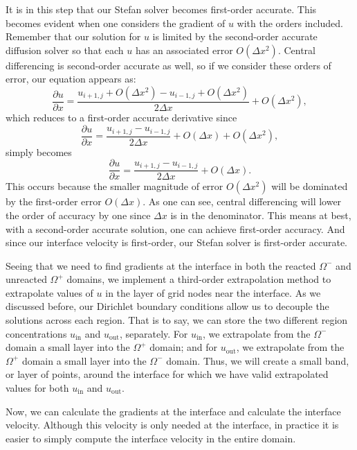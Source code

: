 \documentclass[oneside,12pt,final]{/Applications/TeX/packages/ucthesis-CA2012}
\begin{document}
\begin{mainmatter}
It is in this step that our Stefan solver becomes first-order accurate. This becomes evident when one considers the gradient of $u$ with the orders included. Remember that our solution for $u$ is limited by the second-order accurate diffusion solver so that each $u$ has an associated error $O(\Delta x^2)$. Central differencing is second-order accurate as well, so if we consider these orders of error, our equation appears as:
\begin{equation}
\frac{\partial u}{\partial x} = \frac{u_{i+1,j} + O(\Delta x^2)-u_{i-1,j}+ O(\Delta x^2)}{2 \Delta x} + O(\Delta x^2),
\end{equation}
which reduces to a first-order accurate derivative since 
\begin{equation}
\frac{\partial u}{\partial x} = \frac{u_{i+1,j} -u_{i-1,j}}{2 \Delta x} + O(\Delta x) + O(\Delta x^2),
\end{equation}
simply becomes
\begin{equation}
\frac{\partial u}{\partial x} = \frac{u_{i+1,j} -u_{i-1,j}}{2 \Delta x} + O(\Delta x).
\end{equation}
This occurs because the smaller magnitude of error $O(\Delta x^2)$ will be dominated by the first-order error $O(\Delta x)$. As one can see, central differencing will lower the order of accuracy by one since $\Delta x$ is in the denominator. This means at best, with a second-order accurate solution, one can achieve first-order accuracy. And since our interface velocity is first-order, our Stefan solver is first-order accurate.

Seeing that we need to find gradients at the interface in both the reacted $\Omega^-$ and unreacted $\Omega^+$ domains, we implement a third-order extrapolation method to extrapolate values of $u$ in the layer of grid nodes near the interface. As we discussed before, our Dirichlet boundary conditions allow us to decouple the solutions across each region. That is to say, we can store the two different region concentrations $u_{\text{in}}$ and $u_{\text{out}}$, separately. For $u_{\text{in}}$, we extrapolate from the  $\Omega^-$ domain a small layer into the $\Omega^+$ domain; and for $u_{\text{out}}$, we extrapolate from the $\Omega^+$ domain a small layer into the $\Omega^-$ domain. Thus, we will create a small band, or layer of points, around the interface for which we have valid extrapolated values for both $u_{\text{in}}$ and $u_{\text{out}}$.

Now, we can calculate the gradients at the interface and calculate the interface velocity. Although this velocity is only needed at the interface, in practice it is easier to simply compute the interface velocity in the entire domain. 


\end{mainmatter}
\end{document}
